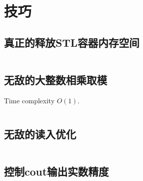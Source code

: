 \chapter{技巧}
\section{真正的释放STL容器内存空间}
\inputminted{cpp}{\source/tricks/truly-release-container-space.cpp}
\section{无敌的大整数相乘取模}
Time complexity $O(1)$.
\inputminted{cpp}{\source/tricks/O1-multiply-mod.cpp}
\section{无敌的读入优化}
\inputminted{cpp}{\source/tricks/unbeatable-input-acceleration.cpp}
\section{控制cout输出实数精度}
\inputminted{cpp}{\source/tricks/control-cout-precision.cpp}
